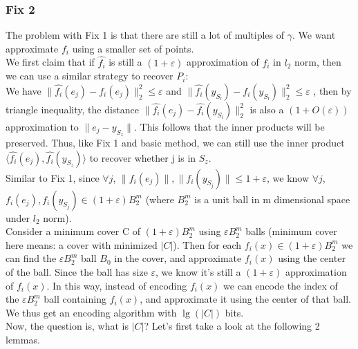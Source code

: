 \documentclass[11pt]{article}
\newcommand{\eps}{\varepsilon}
\begin{document}
\subsubsection{Fix 2}
The problem with Fix 1 is that there are still a lot of multiples of $\gamma$. We want approximate $f_i$ using a smaller set of points. \\

We first claim that if $\hat{f_i}$ is still a $(1+\eps)$ approximation of $f_i$ in $l_2$ norm, then we can use a similar strategy to recover $P_i$:\\ 
We have  $\|\hat{f_i}(e_j) - f_i(e_j)\|_2^2 \leq \eps$ and $\|\hat{f_i}(y_{S_l}) - f_i(y_{S_l})\|_2^2 \leq \eps$ , then by triangle inequality, the distance $\|\hat{f_i}(e_j) - \hat{f_i}(y_{S_l})\|_2^2$ is also a $(1+O(\eps))$ approximation to  $\|e_j - y_{S_z}\|$. This follows that the inner products will be preserved. Thus, like Fix 1 and basic method, we can still use the inner product $\langle \hat{f_i}(e_j) , \hat{f_i}(y_{S_z}) \rangle$ to recover whether j is in $S_z$. \\



Similar to Fix 1, since $\forall j$, $\|f_i(e_j)\|, \|f_i(y_{S_j})\| \leq 1+\eps$, we know $\forall j$, $f_i(e_j), f_i(y_{S_j}) \in (1+\eps)B_2^m$ (where $B_2^m$ is a unit ball in m dimensional space under $l_2$ norm). \\
Consider a minimum cover C of $(1+\eps) B_2^m$ using $\eps B_2^m$ balls (minimum cover here means: a cover with minimized $|C|$). Then for each $f_i(x) \in (1+\eps) B_2^m$ we can find the $\eps B_2^m$ ball $B_0$ in the cover, and approximate $f_i(x)$ using the center of the ball. Since the ball has size $\eps$, we know it's still a $(1+\eps)$ approximation of $f_i(x)$. In this way, instead of encoding $f_i(x)$ we can encode the index of the $\eps B_2^m$ ball containing $f_i(x)$, and approximate it using the center of that ball. We thus get an encoding algorithm with $\lg(|C|)$ bits.\\

Now, the question is, what is $|C|$? Let's first take a look at the following 2 lemmas.
\end{document}
